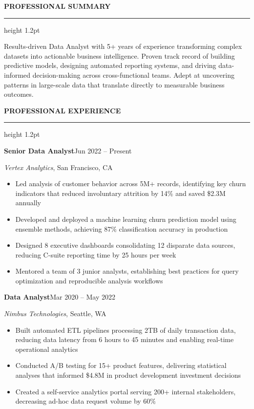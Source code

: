 \documentclass[10pt,letterpaper]{article}
\newcommand{\mainsection}[1]{%
  \vspace{6pt}%
  {\large\bfseries\sffamily\color{primary}#1}\par
  \vspace{2pt}%
  {\color{accent}\hrule height 1.2pt}\par
  \vspace{4pt}%
}
\newcommand{\experience}[4]{%
  {\bfseries\sffamily\small #1}\hfill{\footnotesize\sffamily\color{darktext}#4}\par
  {\itshape\sffamily\color{darktext}\small#2}, #3\par\vspace{1pt}%
}
\begin{document}
\begin{minipage}[t]{0.67\textwidth}

\mainsection{PROFESSIONAL SUMMARY}

{\small\sffamily\color{darktext}
Results-driven Data Analyst with 5+ years of experience transforming complex datasets into actionable business intelligence. Proven track record of building predictive models, designing automated reporting systems, and driving data-informed decision-making across cross-functional teams. Adept at uncovering patterns in large-scale data that translate directly to measurable business outcomes.
}

\mainsection{PROFESSIONAL EXPERIENCE}

\experience{Senior Data Analyst}{Vertex Analytics}{San Francisco, CA}{Jun 2022 -- Present}
\begin{itemize}
  \item {\small\sffamily Led analysis of customer behavior across 5M+ records, identifying key churn indicators that reduced involuntary attrition by 14\% and saved \$2.3M annually}
  \item {\small\sffamily Developed and deployed a machine learning churn prediction model using ensemble methods, achieving 87\% classification accuracy in production}
  \item {\small\sffamily Designed 8 executive dashboards consolidating 12 disparate data sources, reducing C-suite reporting time by 25 hours per week}
  \item {\small\sffamily Mentored a team of 3 junior analysts, establishing best practices for query optimization and reproducible analysis workflows}
\end{itemize}

\vspace{3pt}

\experience{Data Analyst}{Nimbus Technologies}{Seattle, WA}{Mar 2020 -- May 2022}
\begin{itemize}
  \item {\small\sffamily Built automated ETL pipelines processing 2TB of daily transaction data, reducing data latency from 6 hours to 45 minutes and enabling real-time operational analytics}
  \item {\small\sffamily Conducted A/B testing for 15+ product features, delivering statistical analyses that informed \$4.8M in product development investment decisions}
  \item {\small\sffamily Created a self-service analytics portal serving 200+ internal stakeholders, decreasing ad-hoc data request volume by 60\%}
\end{itemize}


\end{minipage}
\end{document}
